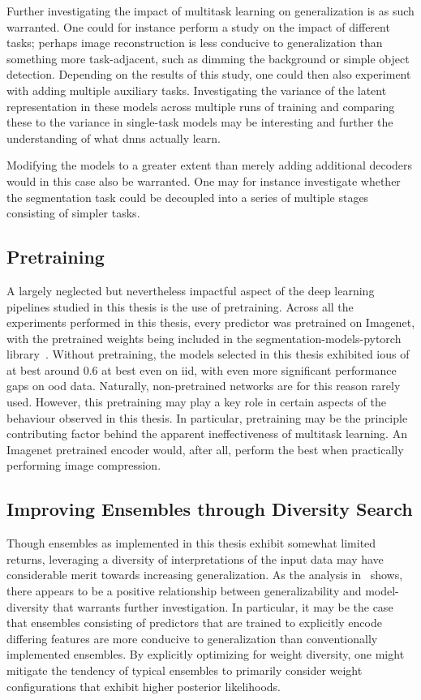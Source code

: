         Further investigating the impact of multitask learning on generalization is as such warranted. One could for instance perform a study on the impact of different tasks; perhaps image reconstruction is less conducive to generalization than something more task-adjacent, such as dimming the background or simple object detection. Depending on the results of this study, one could then also experiment with adding multiple auxiliary tasks. Investigating the variance of the latent representation in these models across multiple runs of training and comparing these to the variance in single-task models may be interesting and further the understanding of what \glspl{dnn} actually learn.
        
        Modifying the models to a greater extent than merely adding additional decoders would in this case also be warranted. One may for instance investigate whether the segmentation task could be decoupled into a series of multiple stages consisting of simpler tasks.
    
    \subsection{Pretraining} \label{pretraining}
        A largely neglected but nevertheless impactful aspect of the deep learning pipelines studied in this thesis is the use of pretraining. Across all the experiments performed in this thesis, every predictor was pretrained on Imagenet, with the pretrained weights being included in the segmentation-models-pytorch library~\cite{smp}. Without pretraining, the models selected in this thesis exhibited \glspl{iou} of at best around 0.6 at best even on \gls{iid}, with even more significant performance gaps on \gls{ood} data. Naturally, non-pretrained networks are for this reason rarely used. However, this pretraining may play a key role in certain aspects of the behaviour observed in this thesis. In particular, pretraining may be the principle contributing factor behind the apparent ineffectiveness of multitask learning. An Imagenet pretrained encoder would, after all, perform the best when practically performing image compression.
        
            \subsection{Improving Ensembles through Diversity Search}
    Though ensembles as implemented in this thesis exhibit somewhat limited returns, leveraging a diversity of interpretations of the input data may have considerable merit towards increasing generalization. As the analysis in~ shows, there appears to be a positive relationship between generalizability and model-diversity that warrants further investigation. In particular, it may be the case that ensembles consisting of predictors that are trained to explicitly encode differing features are more conducive to generalization than conventionally implemented ensembles. By explicitly optimizing for weight diversity, one might mitigate the tendency of typical ensembles to primarily consider weight configurations that exhibit higher posterior likelihoods. 
    
